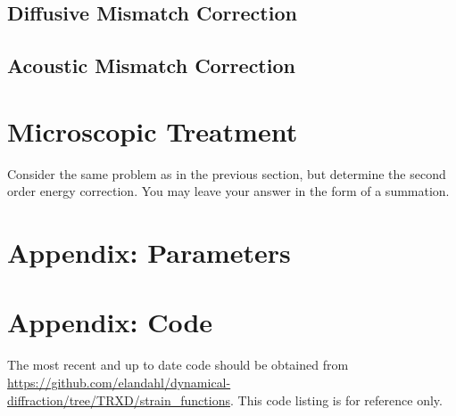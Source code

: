 \documentclass[letterpaper,11pt]{article}
\begin{document}
\subsection{Diffusive Mismatch Correction}

\subsection{Acoustic Mismatch Correction}

\section{Microscopic Treatment}
Consider the same problem as in the previous section, but determine the second order energy correction.  You may leave your answer in the form of a summation.

\newpage

\section*{Appendix: Parameters}

\section*{Appendix: Code}

The most recent and up to date code should be obtained from \url{https://github.com/elandahl/dynamical-diffraction/tree/TRXD/strain_functions}.  This code listing is for reference only. 
 

\end{document}
